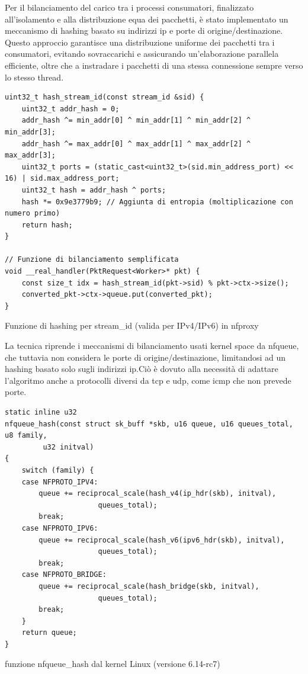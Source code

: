 Per il bilanciamento del carico tra i processi consumatori, finalizzato all'isolamento e alla distribuzione equa dei pacchetti, è stato implementato un meccanismo di hashing basato su indirizzi \gls{ip} e porte di origine/destinazione. Questo approccio garantisce una distribuzione uniforme dei pacchetti tra i consumatori, evitando sovraccarichi e assicurando un'elaborazione parallela efficiente, oltre che a instradare i pacchetti di una stessa connessione sempre verso lo stesso thread.\\

\begin{listing}[H]
\begin{verbatim}
uint32_t hash_stream_id(const stream_id &sid) {
    uint32_t addr_hash = 0;
    addr_hash ^= min_addr[0] ^ min_addr[1] ^ min_addr[2] ^ min_addr[3];
    addr_hash ^= max_addr[0] ^ max_addr[1] ^ max_addr[2] ^ max_addr[3];
    uint32_t ports = (static_cast<uint32_t>(sid.min_address_port) << 16) | sid.max_address_port;
    uint32_t hash = addr_hash ^ ports;
    hash *= 0x9e3779b9; // Aggiunta di entropia (moltiplicazione con numero primo)
    return hash;
}

// Funzione di bilanciamento semplificata
void __real_handler(PktRequest<Worker>* pkt) {
    const size_t idx = hash_stream_id(pkt->sid) % pkt->ctx->size();
    converted_pkt->ctx->queue.put(converted_pkt);
}
\end{verbatim}
\caption{Funzione di hashing per stream\_id (valida per IPv4/IPv6) in \gls{nfproxy}}\label{lst:nfproxy_hash}
\end{listing}

La tecnica riprende i meccanismi di bilanciamento usati kernel space da \gls{nfqueue}, che tuttavia non considera le porte di origine/destinazione,
limitandosi ad un hashing basato solo sugli indirizzi \gls{ip}.\@ Ciò è dovuto alla necessità di adattare l'algoritmo anche a protocolli diversi da \gls{tcp} e \gls{udp}, come \gls{icmp} che non prevede porte.

\begin{listing}[H]
\begin{verbatim}
static inline u32
nfqueue_hash(const struct sk_buff *skb, u16 queue, u16 queues_total, u8 family,
	     u32 initval)
{
	switch (family) {
	case NFPROTO_IPV4:
		queue += reciprocal_scale(hash_v4(ip_hdr(skb), initval),
					  queues_total);
		break;
	case NFPROTO_IPV6:
		queue += reciprocal_scale(hash_v6(ipv6_hdr(skb), initval),
					  queues_total);
		break;
	case NFPROTO_BRIDGE:
		queue += reciprocal_scale(hash_bridge(skb, initval),
					  queues_total);
		break;
	}
	return queue;
}
\end{verbatim}
\caption{funzione nfqueue\_hash dal kernel Linux (versione 6.14-rc7)}\label{lst:nfqueue_hash_linux}
\end{listing}

